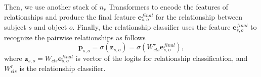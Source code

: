 Then, we use another stack of $n_r$ Transformers to encode the features of relationships and produce the final feature $\mathbf{e}_{s,o}^{final}$ for the relationship between subject $s$ and object $o$. Finally, the relationship classifier uses the feature $\mathbf{e}_{s,o}^{final}$ to recognize the pairwise relationships as follows
\begin{equation}
	\mathbf{p}_{s,o} = \sigma(\mathbf{z}_{s,o}) = \sigma(W_{cls}^r\mathbf{e}_{s,o}^{final}),
	\label{eq:p}
\end{equation}
where $\mathbf{z}_{s,o} = W_{cls}\mathbf{e}_{s,o}^{final}$ is  vector of the logits for relationship classification, and$W_{cls}^r$ is the relationship classifier.

